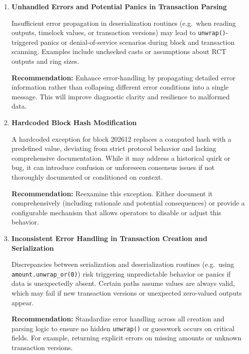 \documentclass[12pt,a4paper]{article}
\begin{document}
\begin{enumerate}
    \item \textbf{Unhandled Errors and Potential Panics in Transaction Parsing}

    Insufficient error propagation in deserialization routines (e.g.\ when reading outputs, timelock values, or transaction versions) may lead to \texttt{unwrap()}-triggered panics or denial-of-service scenarios during block and transaction scanning. Examples include unchecked casts or assumptions about RCT outputs and ring sizes.

    \textbf{Recommendation:}
    Enhance error-handling by propagating detailed error information rather than collapsing different error conditions into a single message. This will improve diagnostic clarity and resilience to malformed data.

    \item \textbf{Hardcoded Block Hash Modification}

    A hardcoded exception for block 202612 replaces a computed hash with a predefined value, deviating from strict protocol behavior and lacking comprehensive documentation. While it may address a historical quirk or bug, it can introduce confusion or unforeseen consensus issues if not thoroughly documented or conditioned on context.

    \textbf{Recommendation:}
    Reexamine this exception. Either document it comprehensively (including rationale and potential consequences) or provide a configurable mechanism that allows operators to disable or adjust this behavior.

    \item \textbf{Inconsistent Error Handling in Transaction Creation and Serialization}

    Discrepancies between serialization and deserialization routines (e.g.\ using \texttt{amount.unwrap\_or(0)}) risk triggering unpredictable behavior or panics if data is unexpectedly absent. Certain paths assume values are always valid, which may fail if new transaction versions or unexpected zero-valued outputs appear.

    \textbf{Recommendation:}
    Standardize error handling across all creation and parsing logic to ensure no hidden \texttt{unwrap()} or guesswork occurs on critical fields. For example, returning explicit errors on missing amounts or unknown transaction versions.


\end{enumerate}
\end{document}
